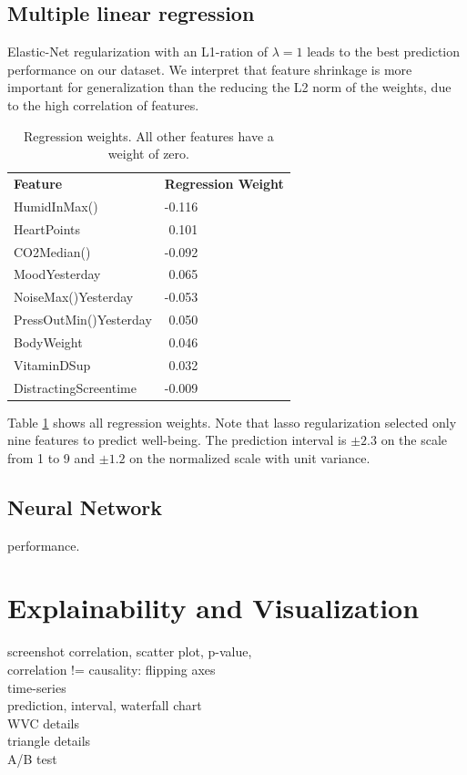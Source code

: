\documentclass[conference]{IEEEtran}
\begin{document}
\subsection{Multiple linear regression}
Elastic-Net regularization with an L1-ration of $\lambda=1$ leads to the best prediction performance on our dataset. We interpret that feature shrinkage is more important for generalization than the reducing the L2 norm of the weights, due to the high correlation of features.

\begin{table}[]
\caption[]{Regression weights. All other features have a weight of zero.}
\begin{tabular}{ll}
\textbf{Feature}       & \textbf{Regression Weight} \\
HumidInMax()           & -0.116                     \\
HeartPoints            & \,\,0.101                      \\
CO2Median()            & -0.092                     \\
MoodYesterday          & \,\,0.065                      \\
NoiseMax()Yesterday    & -0.053                     \\
PressOutMin()Yesterday & \,\,0.050                      \\
BodyWeight             & \,\,0.046                      \\
VitaminDSup            & \,\,0.032                      \\
DistractingScreentime  & -0.009                    
\end{tabular}
\label{tab:reg}
\end{table}

Table \ref{tab:reg} shows all regression weights. Note that lasso regularization selected only nine features to predict well-being. 
The prediction interval is $\pm2.3$ on the scale from 1 to 9 and $\pm1.2$ on the normalized scale with unit variance. 
\color{red}

\subsection{Neural Network}
performance.

\section{Explainability and Visualization}
screenshot correlation, scatter plot, p-value, \\
correlation != causality: flipping axes\\
time-series\\
prediction, interval, waterfall chart \\
WVC details\\
triangle details\\
A/B test\\
\end{document}
